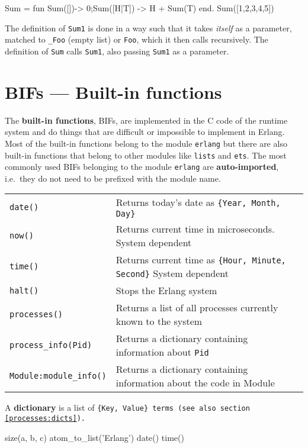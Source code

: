 \begin{erlang}
Sum = fun Sum([])-> 0;Sum([H|T]) -> H + Sum(T) end.
Sum([1,2,3,4,5])    %
\end{erlang}

The definition of \texttt{Sum1} is done in a way such that it takes \textit{itself} as a parameter, matched to \texttt{\_Foo} (empty list) or \texttt{Foo},
which it then calls recursively.  The definition of \texttt{Sum} calls \texttt{Sum1}, also passing \texttt{Sum1} as a parameter.

\section{BIFs --- Built-in functions}
\label{functions:bifs}
The \textbf{built-in functions}, BIFs, are implemented in the C code of
the runtime system and do things that are difficult or impossible to
implement in Erlang. Most of the built-in functions belong to the
module \texttt{erlang} but there are also built-in functions that belong
to other modules like \texttt{lists} and \texttt{ets}. The most
commonly used BIFs belonging to the module \texttt{erlang} are
\textbf{auto-imported}, i.e.~they do not need to be prefixed with the
module name.

\begin{center}
\begin{tabular}{|>{\raggedright}p{103pt}|>{\raggedright}p{217pt}|}
\hline
\multicolumn{2}{|p{321pt}|}{Some useful BIFs}\tabularnewline
\hline
\texttt{date()} & Returns today's date as \texttt{\{Year, Month, Day\}}\tabularnewline
\hline
\texttt{now()} & Returns current time in microseconds. System dependent\tabularnewline
\hline
\texttt{time()} & Returns current time as \texttt{\{Hour, Minute, Second\}} System dependent\tabularnewline
\hline
\texttt{halt()} & Stops the Erlang system\tabularnewline
\hline
\texttt{processes()} & Returns a list of all processes currently known to the system\tabularnewline
\hline
\texttt{process\_info(Pid)} & Returns a dictionary containing information about \texttt{Pid}\tabularnewline
\hline
\texttt{Module:module\_info()} & Returns a dictionary containing information about the code
in Module\tabularnewline
\hline
\end{tabular}
\end{center}

A \textbf{dictionary} is a list of \texttt{\{Key, Value\} terms (see
also section \ref{processes:dicts}).}

\begin{erlang}
size({a, b, c})             %
atom_to_list('Erlang')      %
date()                      %
time()                      %
\end{erlang}
